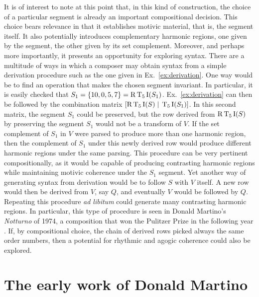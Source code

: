 
It is of interest to note at this point that, in this kind of construction, the choice of a particular segment is already an important compositional decision. This choice bears relevance in that it establishes motivic material, that is, the segment itself. It also potentially introduces complementary harmonic regions, one given by the segment, the other given by its set complement. Moreover, and perhaps more importantly, it presents an opportunity for exploring syntax. There are a multitude of ways in which a composer may obtain syntax from a simple derivation procedure such as the one given in Ex.~\ref{ex:derivation}. One way would be to find an operation that makes the chosen segment invariant. In particular, it is easily checked that $S_1 = \{ 10, 0, 5, 7 \} = \operatorname{R}\operatorname{T}_5\operatorname{I}(S_1)$. Ex.~\ref{ex:derivation} can then be followed by the combination matrix $[\operatorname{R}\operatorname{T}_5\operatorname{I}(S) \; | \; \operatorname{T}_5\operatorname{I}(S_1)]$. In this second matrix, the segment $S_1$ could be preserved, but the row derived from $\operatorname{R}\operatorname{T}_5\operatorname{I}(S)$ by preserving the segment $S_1$ would not be a transform of $V$. If the set complement of $S_1$ in $V$ were parsed to produce more than one harmonic region, then the complement of $S_1$ under this newly derived row would produce different harmonic regions under the same parsing. This procedure can be very pertinent compositionally, as it would be capable of producing contrasting harmonic regions while maintaining motivic coherence under the $S_1$ segment. Yet another way of generating syntax from derivation would be to follow $S$ with $V$ itself. A new row would then be derived from $V$, say $Q$, and eventually $V$ would be followed by $Q$. Repeating this procedure \emph{ad libitum} could generate many contrasting harmonic regions. In particular, this type of procedure is seen in Donald Martino's \emph{Notturno} of 1974, a composition that won the Pulitzer Prize in the following year \cite[181]{Starr1984}. If, by compositional choice, the chain of derived rows picked always the same order numbers, then a potential for rhythmic and agogic coherence could also be explored.


\section{The early work of Donald Martino}

